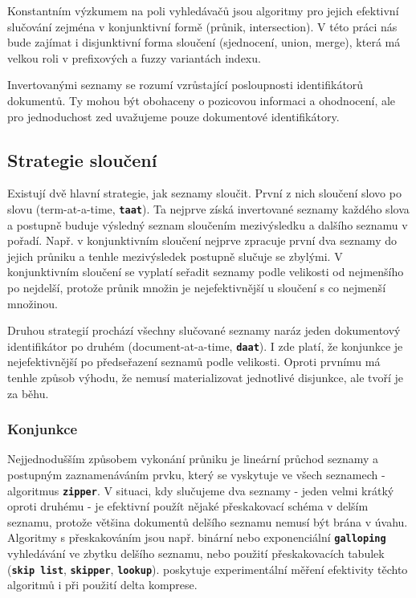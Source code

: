 \documentclass[11pt,letterpaper,oneside,openright]{book}
\newcommand{\bftt}[1]{\texttt{\textbf{#1}}}
\begin{document}
Konstantním výzkumem na poli vyhledávačů jsou algoritmy pro jejich efektivní
slučování zejména v konjunktivní formě (průnik, intersection). V této práci nás
bude zajímat i disjunktivní forma sloučení (sjednocení, union, merge), která má
velkou roli v prefixových a fuzzy variantách indexu. 

Invertovanými seznamy se rozumí vzrůstající posloupnosti identifikátorů
dokumentů. Ty mohou být obohaceny o pozicovou informaci a ohodnocení, ale pro
jednoduchost zed uvažujeme pouze dokumentové identifikátory.

\subsection{Strategie sloučení}
Existují dvě hlavní strategie, jak seznamy sloučit. První z nich sloučení slovo
po slovu (term-at-a-time, \bftt{taat}). Ta nejprve získá invertované seznamy každého
slova a postupně buduje výsledný seznam sloučením mezivýsledku a dalšího
seznamu v pořadí. Např. v konjunktivním sloučení nejprve zpracuje první dva
seznamy do jejich průniku a tenhle mezivýsledek postupně slučuje se zbylými. V
konjunktivním sloučení se vyplatí seřadit seznamy podle velikosti od nejmenšího
po nejdelší, protože průnik množin je nejefektivnější u sloučení s co nejmenší
množinou.

Druhou strategií prochází všechny slučované seznamy naráz jeden dokumentový
identifikátor po druhém (document-at-a-time, \bftt{daat}). I zde platí, že konjunkce
je nejefektivnější po předseřazení seznamů podle velikosti. Oproti prvnímu má
tenhle způsob výhodu, že nemusí materializovat jednotlivé disjunkce, ale tvoří
je za běhu.

\subsubsection{Konjunkce}
Nejjednodušším způsobem vykonání průniku je lineární průchod seznamy a postupným
zaznamenáváním prvku, který se vyskytuje ve všech seznamech - algoritmus
\bftt{zipper}. V situaci, kdy slučujeme dva seznamy - jeden velmi krátký oproti
druhému - je efektivní použít nějaké přeskakovací schéma v delším seznamu,
protože většina dokumentů delšího seznamu nemusí být brána v úvahu. Algoritmy s
přeskakováním jsou např. binární nebo exponenciální \bftt{galloping}
vyhledávání ve zbytku delšího seznamu, nebo použití přeskakovacích tabulek
(\bftt{skip list}, \bftt{skipper}, \bftt{lookup}).
\cite{Sanders:2007:III:2791188.2791195} poskytuje experimentální měření
efektivity těchto algoritmů i při použití delta komprese.
\end{document}
